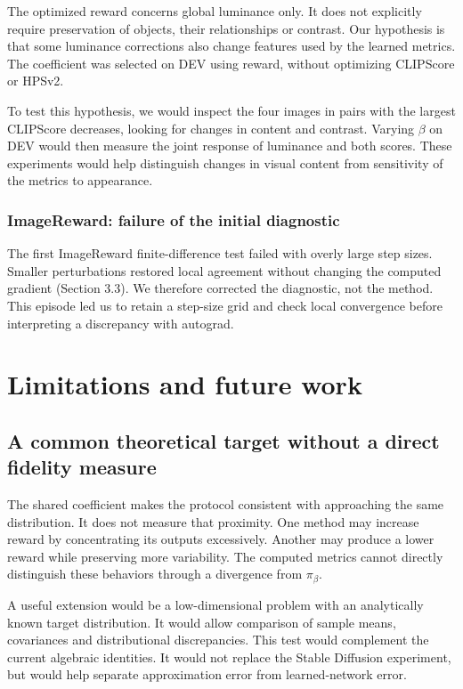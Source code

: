 \documentclass[11pt,a4paper]{article}
\begin{document}
The optimized reward concerns global luminance only. It does not explicitly require preservation of objects, their relationships or contrast. Our hypothesis is that some luminance corrections also change features used by the learned metrics. The coefficient was selected on DEV using reward, without optimizing CLIPScore or HPSv2.

To test this hypothesis, we would inspect the four images in pairs with the largest CLIPScore decreases, looking for changes in content and contrast. Varying $\beta$ on DEV would then measure the joint response of luminance and both scores. These experiments would help distinguish changes in visual content from sensitivity of the metrics to appearance.

\subsubsection*{ImageReward: failure of the initial diagnostic}
The first ImageReward finite-difference test failed with overly large step sizes. Smaller perturbations restored local agreement without changing the computed gradient (Section 3.3). We therefore corrected the diagnostic, not the method. This episode led us to retain a step-size grid and check local convergence before interpreting a discrepancy with autograd.

\section{Limitations and future work}
\subsection{A common theoretical target without a direct fidelity measure}
The shared coefficient makes the protocol consistent with approaching the same distribution. It does not measure that proximity. One method may increase reward by concentrating its outputs excessively. Another may produce a lower reward while preserving more variability. The computed metrics cannot directly distinguish these behaviors through a divergence from $\pi_\beta$.

A useful extension would be a low-dimensional problem with an analytically known target distribution. It would allow comparison of sample means, covariances and distributional discrepancies. This test would complement the current algebraic identities. It would not replace the Stable Diffusion experiment, but would help separate approximation error from learned-network error.
\end{document}
